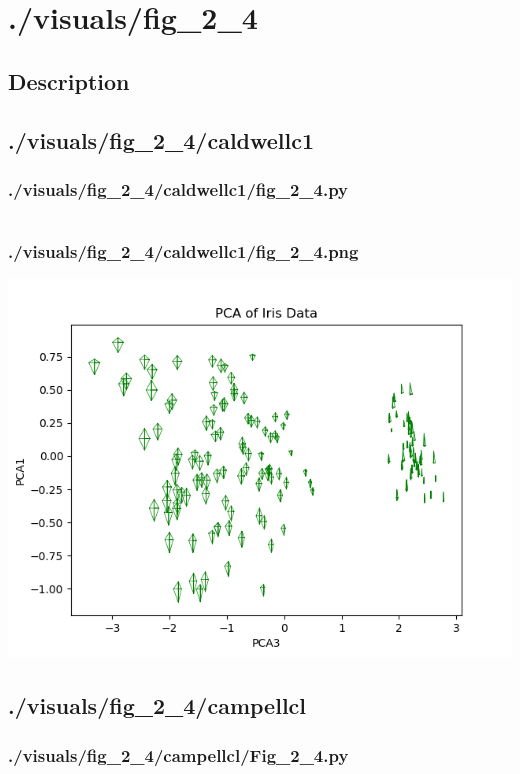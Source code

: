 \documentclass{report}
\begin{document}
    \chapter{./visuals/fig\_2\_4}
    \section{Description}
    \small
    
    \pagebreak
    \section{./visuals/fig\_2\_4/caldwellc1}
    \subsection{./visuals/fig\_2\_4/caldwellc1/fig\_2\_4.py}
    \inputminted[breaklines=true]{python}{.././visuals/fig_2_4/caldwellc1/fig_2_4.py}
    \subsection{./visuals/fig\_2\_4/caldwellc1/fig\_2\_4.png}
    \includegraphics[width=\textwidth]{.././visuals/fig_2_4/caldwellc1/fig_2_4.png}
    \pagebreak
    \section{./visuals/fig\_2\_4/campellcl}
    \subsection{./visuals/fig\_2\_4/campellcl/Fig\_2\_4.py}
    \inputminted[breaklines=true]{python}{.././visuals/fig_2_4/campellcl/Fig_2_4.py}
\end{document}
